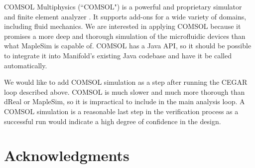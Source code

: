 COMSOL Multiphysics (``COMSOL") \cite{comsol} is a powerful and proprietary simulator and finite element analyzer \cite{fem}.
It supports add-ons for a wide variety of domains, including fluid mechanics.
We are interested in applying COMSOL because it promises a more deep and thorough simulation of the microfluidic devices than what MapleSim is capable of.
COMSOL has a Java API, so it should be possible to integrate it into Manifold's existing Java codebase and have it be called automatically.


We would like to add COMSOL simulation as a step after running the CEGAR loop described above.
COMSOL is much slower and much more thorough than dReal or MapleSim, so it is impractical to include
in the main analysis loop. A COMSOL simulation is a reasonable last step in the
verification process as a successful run would indicate a high degree of confidence in the design.

\section{Acknowledgments}


